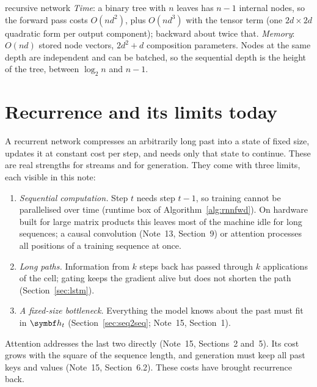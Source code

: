 \documentclass[11pt]{article}
\newcommand{\hv}{\vect{h}}
\begin{document}
\begin{runtime}{recursive network}
\emph{Time}: a binary tree with $n$ leaves has $n - 1$ internal nodes, so the forward pass costs $O(nd^2)$, plus
$O(nd^3)$ with the tensor term (one $2d \times 2d$ quadratic form per output component); backward about twice that.
\emph{Memory}: $O(nd)$ stored node vectors, $2d^2 + d$ composition parameters. Nodes at the same depth are independent and
can be batched, so the sequential depth is the height of the tree, between $\log_2 n$ and $n - 1$.
\end{runtime}

\section{Recurrence and its limits today}\label{sec:today}

A recurrent network compresses an arbitrarily long past into a state of fixed size, updates it at constant cost per
step, and needs only that state to continue. These are real strengths for streams and for generation. They come with
three limits, each visible in this note:
\begin{enumerate}
\item \emph{Sequential computation.} Step $t$ needs step $t - 1$, so training cannot be parallelised over time
  (runtime box of Algorithm~\ref{alg:rnnfwd}). On hardware built for large matrix products this leaves most of the machine
  idle for long sequences; a causal convolution (Note~13, Section~9) or attention processes all positions of a training
  sequence at once.
\item \emph{Long paths.} Information from $k$ steps back has passed through $k$ applications of the cell; gating keeps the
  gradient alive but does not shorten the path (Section~\ref{sec:lstm}).
\item \emph{A fixed-size bottleneck.} Everything the model knows about the past must fit in $\hv_t$ (Section~\ref{sec:seq2seq}; Note~15, Section~1).
\end{enumerate}
Attention addresses the last two directly (Note~15, Sections~2 and~5). Its cost grows with the square of the sequence
length, and generation must keep all past keys and values (Note~15, Section~6.2). These costs have brought recurrence
back.
\end{document}
